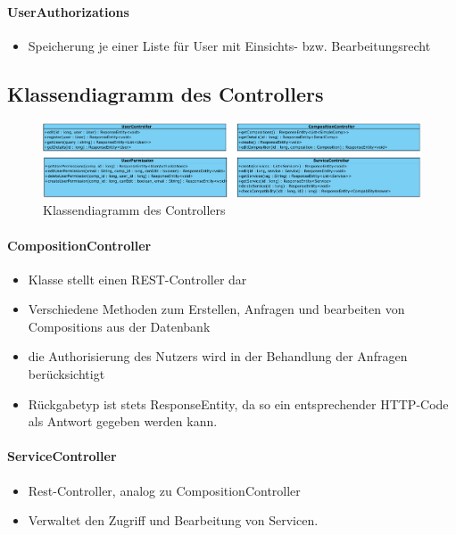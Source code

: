 \paragraph{UserAuthorizations}
\begin{itemize}
	\item Speicherung je einer Liste für User mit Einsichts- bzw. Bearbeitungsrecht
\end{itemize}

\subsection*{Klassendiagramm des Controllers}
\begin{figure}[!h]
	\centering
	\includegraphics[width=\textwidth]{img/Diagramme/Klassen/Controller}
	\caption{Klassendiagramm des Controllers}
	\label{fig:klassendiagramm-controller}
\end{figure}


\paragraph{CompositionController}
\begin{itemize}
	\item Klasse stellt einen REST-Controller dar
	\item Verschiedene Methoden zum Erstellen, Anfragen und bearbeiten von Compositions aus der Datenbank
	\item die Authorisierung des Nutzers wird in der Behandlung der Anfragen berücksichtigt
	\item Rückgabetyp ist stets ResponseEntity, da so ein entsprechender HTTP-Code als Antwort gegeben werden kann.
\end{itemize}
\paragraph{ServiceController}
\begin{itemize}
	\item Rest-Controller, analog zu CompositionController
	\item Verwaltet den Zugriff und Bearbeitung von Servicen.
\end{itemize}
